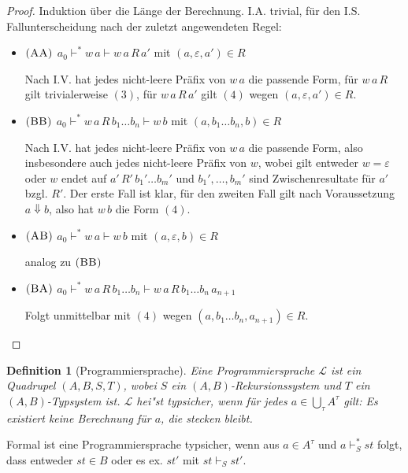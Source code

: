 \documentclass[12pt,a2paper,draft]{article}
\newcommand{\rn}[1]{\mbox{\ensuremath{\textsc{(#1)}}}}
\newtheorem{definition}{Definition}
\begin{document}
\begin{proof}
  Induktion \"uber die L\"ange der Berechnung. I.A. trivial, f\"ur den
  I.S. Fallunterscheidung nach der zuletzt angewendeten Regel:
  \begin{itemize}
  \item \rn{AA} $a_0 \vdash^* w\,a \vdash w\,a\,R\,a'$ mit $(a,\varepsilon,a') \in R$
    
    Nach I.V. hat jedes nicht-leere Pr\"afix von $w\,a$ die passende Form, f\"ur $w\,a\,R$
    gilt trivialerweise $(3)$, f\"ur $w\,a\,R\,a'$ gilt $(4)$ wegen $(a,\varepsilon,a') \in R$.

  \item \rn{BB} $a_0 \vdash^* w\,a\,R\,b_1 \ldots b_n \vdash w\,b$ mit $(a,b_1 \ldots b_n,b) \in R$

    Nach I.V. hat jedes nicht-leere Pr\"afix von $w\,a$ die passende Form, also insbesondere auch
    jedes nicht-leere Pr\"afix von $w$, wobei gilt entweder $w = \varepsilon$ oder $w$ endet
    auf $a'\,R'\,b_1' \ldots b_m'$ und $b_1',\ldots,b_m'$ sind Zwischenresultate f\"ur $a'$ bzgl.
    $R'$.
    Der erste Fall ist klar, f\"ur den zweiten Fall gilt nach Voraussetzung $a \Downarrow b$,
    also hat $w\,b$ die Form $(4)$.

  \item \rn{AB} $a_0 \vdash^* w\,a \vdash w\,b$ mit $(a,\varepsilon,b) \in R$

    analog zu \rn{BB}

  \item \rn{BA} $a_0 \vdash^* w\,a\,R\,b_1 \ldots b_n \vdash w\,a\,R\,b_1 \ldots b_n\,a_{n+1}$

    Folgt unmittelbar mit $(4)$ wegen $(a,b_1 \ldots b_n,a_{n+1}) \in R$.
  \end{itemize}
\end{proof}

\begin{definition}[Programmiersprache]
  Eine \emph{Programmiersprache} $\mathcal{L}$ ist ein Quadrupel $(A,B,S,T)$, wobei $S$ ein
  $(A,B)$-Rekursionssystem und $T$ ein $(A,B)$-Typsystem ist. $\mathcal{L}$ hei"st \emph{typsicher},
  wenn f\"ur jedes $a \in \bigcup_{\tau}A^\tau$ gilt: Es existiert keine Berechnung f\"ur $a$,
  die stecken bleibt.
\end{definition}

Formal ist eine Programmiersprache typsicher, wenn aus $a \in A^\tau$ und $a \vdash^*_S st$ folgt,
dass entweder $st \in B$ oder es ex. $st'$ mit $st \vdash_S st'$.
\end{document}
